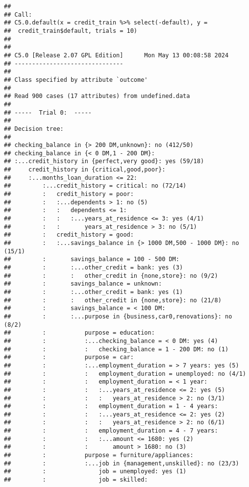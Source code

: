 \documentclass[
]{article}
\begin{document}
\begin{verbatim}
## 
## Call:
## C5.0.default(x = credit_train %>% select(-default), y =
##  credit_train$default, trials = 10)
## 
## 
## C5.0 [Release 2.07 GPL Edition]      Mon May 13 00:08:58 2024
## -------------------------------
## 
## Class specified by attribute `outcome'
## 
## Read 900 cases (17 attributes) from undefined.data
## 
## -----  Trial 0:  -----
## 
## Decision tree:
## 
## checking_balance in {> 200 DM,unknown}: no (412/50)
## checking_balance in {< 0 DM,1 - 200 DM}:
## :...credit_history in {perfect,very good}: yes (59/18)
##     credit_history in {critical,good,poor}:
##     :...months_loan_duration <= 22:
##         :...credit_history = critical: no (72/14)
##         :   credit_history = poor:
##         :   :...dependents > 1: no (5)
##         :   :   dependents <= 1:
##         :   :   :...years_at_residence <= 3: yes (4/1)
##         :   :       years_at_residence > 3: no (5/1)
##         :   credit_history = good:
##         :   :...savings_balance in {> 1000 DM,500 - 1000 DM}: no (15/1)
##         :       savings_balance = 100 - 500 DM:
##         :       :...other_credit = bank: yes (3)
##         :       :   other_credit in {none,store}: no (9/2)
##         :       savings_balance = unknown:
##         :       :...other_credit = bank: yes (1)
##         :       :   other_credit in {none,store}: no (21/8)
##         :       savings_balance = < 100 DM:
##         :       :...purpose in {business,car0,renovations}: no (8/2)
##         :           purpose = education:
##         :           :...checking_balance = < 0 DM: yes (4)
##         :           :   checking_balance = 1 - 200 DM: no (1)
##         :           purpose = car:
##         :           :...employment_duration = > 7 years: yes (5)
##         :           :   employment_duration = unemployed: no (4/1)
##         :           :   employment_duration = < 1 year:
##         :           :   :...years_at_residence <= 2: yes (5)
##         :           :   :   years_at_residence > 2: no (3/1)
##         :           :   employment_duration = 1 - 4 years:
##         :           :   :...years_at_residence <= 2: yes (2)
##         :           :   :   years_at_residence > 2: no (6/1)
##         :           :   employment_duration = 4 - 7 years:
##         :           :   :...amount <= 1680: yes (2)
##         :           :       amount > 1680: no (3)
##         :           purpose = furniture/appliances:
##         :           :...job in {management,unskilled}: no (23/3)
##         :               job = unemployed: yes (1)
##         :               job = skilled:

\end{verbatim}
\end{document}
